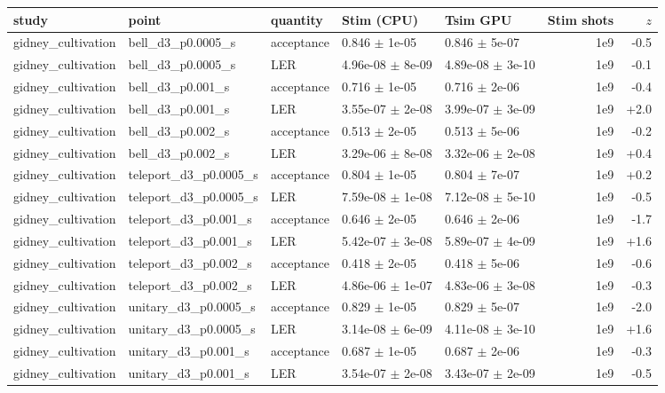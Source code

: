 \documentclass[10pt]{article}
\begin{document}
{\scriptsize
\begin{longtable}{l l l l l r r}
\toprule
study & point & quantity & Stim (CPU) & Tsim GPU & Stim shots & $z$ \\
\midrule
\endhead
gidney\_cultivation & bell\_d3\_p0.0005\_s & acceptance & 0.846 $\pm$ 1e-05 & 0.846 $\pm$ 5e-07 & 1e9 & -0.5 \\
gidney\_cultivation & bell\_d3\_p0.0005\_s & LER & 4.96e-08 $\pm$ 8e-09 & 4.89e-08 $\pm$ 3e-10 & 1e9 & -0.1 \\
gidney\_cultivation & bell\_d3\_p0.001\_s & acceptance & 0.716 $\pm$ 1e-05 & 0.716 $\pm$ 2e-06 & 1e9 & -0.4 \\
gidney\_cultivation & bell\_d3\_p0.001\_s & LER & 3.55e-07 $\pm$ 2e-08 & 3.99e-07 $\pm$ 3e-09 & 1e9 & +2.0 \\
gidney\_cultivation & bell\_d3\_p0.002\_s & acceptance & 0.513 $\pm$ 2e-05 & 0.513 $\pm$ 5e-06 & 1e9 & -0.2 \\
gidney\_cultivation & bell\_d3\_p0.002\_s & LER & 3.29e-06 $\pm$ 8e-08 & 3.32e-06 $\pm$ 2e-08 & 1e9 & +0.4 \\
gidney\_cultivation & teleport\_d3\_p0.0005\_s & acceptance & 0.804 $\pm$ 1e-05 & 0.804 $\pm$ 7e-07 & 1e9 & +0.2 \\
gidney\_cultivation & teleport\_d3\_p0.0005\_s & LER & 7.59e-08 $\pm$ 1e-08 & 7.12e-08 $\pm$ 5e-10 & 1e9 & -0.5 \\
gidney\_cultivation & teleport\_d3\_p0.001\_s & acceptance & 0.646 $\pm$ 2e-05 & 0.646 $\pm$ 2e-06 & 1e9 & -1.7 \\
gidney\_cultivation & teleport\_d3\_p0.001\_s & LER & 5.42e-07 $\pm$ 3e-08 & 5.89e-07 $\pm$ 4e-09 & 1e9 & +1.6 \\
gidney\_cultivation & teleport\_d3\_p0.002\_s & acceptance & 0.418 $\pm$ 2e-05 & 0.418 $\pm$ 5e-06 & 1e9 & -0.6 \\
gidney\_cultivation & teleport\_d3\_p0.002\_s & LER & 4.86e-06 $\pm$ 1e-07 & 4.83e-06 $\pm$ 3e-08 & 1e9 & -0.3 \\
gidney\_cultivation & unitary\_d3\_p0.0005\_s & acceptance & 0.829 $\pm$ 1e-05 & 0.829 $\pm$ 5e-07 & 1e9 & -2.0 \\
gidney\_cultivation & unitary\_d3\_p0.0005\_s & LER & 3.14e-08 $\pm$ 6e-09 & 4.11e-08 $\pm$ 3e-10 & 1e9 & +1.6 \\
gidney\_cultivation & unitary\_d3\_p0.001\_s & acceptance & 0.687 $\pm$ 1e-05 & 0.687 $\pm$ 2e-06 & 1e9 & -0.3 \\
gidney\_cultivation & unitary\_d3\_p0.001\_s & LER & 3.54e-07 $\pm$ 2e-08 & 3.43e-07 $\pm$ 2e-09 & 1e9 & -0.5 \\

\end{longtable}}
\end{document}
